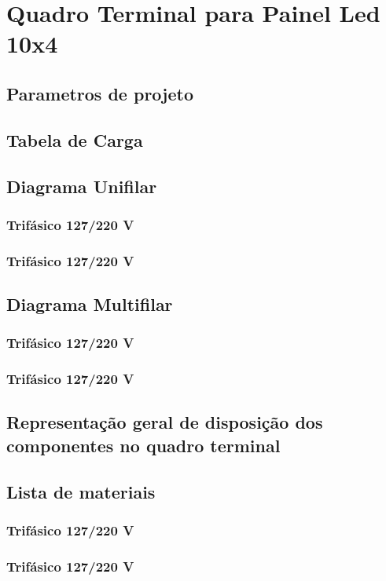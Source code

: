 \section{Quadro Terminal para Painel Led 10x4}
\subsection{Parametros de projeto}
\subsection{Tabela de Carga}
\subsection{Diagrama Unifilar}

\subsubsection{Trifásico 127/220 V}

\subsubsection{Trifásico 127/220 V}

\subsection{Diagrama Multifilar}

\subsubsection{Trifásico 127/220 V}

\subsubsection{Trifásico 127/220 V}

\subsection{Representação geral de disposição dos componentes no quadro terminal}

\subsection{Lista de materiais}

\subsubsection{Trifásico 127/220 V}

\subsubsection{Trifásico 127/220 V}